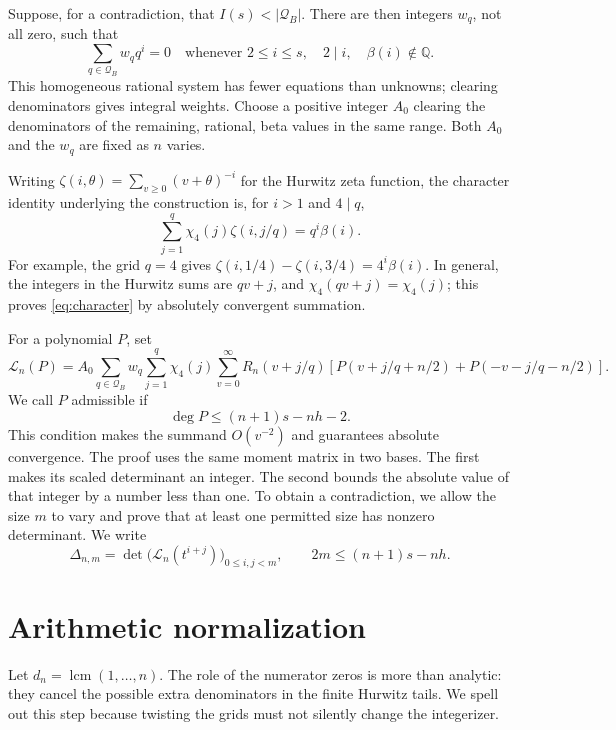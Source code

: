 \documentclass[11pt]{article}
\theoremstyle{remark}
\newcommand{\Q}{\mathbb Q}
\newcommand{\Lcal}{\mathcal L}
\DeclareMathOperator{\lcm}{lcm}
\numberwithin{equation}{section}
\begin{document}
Suppose, for a contradiction, that $I(s)<|\mathcal Q_B|$. There are then
integers $w_q$, not all zero, such that
\begin{equation}\label{eq:elimination}
 \sum_{q\in\mathcal Q_B}w_q q^i=0
 \quad\text{whenever }2\leq i\leq s,\quad2\mid i,\quad\beta(i)\notin\Q.
\end{equation}
This homogeneous rational system has fewer equations than unknowns; clearing
denominators gives integral weights. Choose a positive integer $A_0$ clearing
the denominators of the remaining, rational, beta values in the same range.
Both $A_0$ and the $w_q$ are fixed as $n$ varies.

Writing $\zeta(i,\theta)=\sum_{v\geq0}(v+\theta)^{-i}$ for the Hurwitz
zeta function, the character identity underlying the construction is,
for $i>1$ and $4\mid q$,
\begin{equation}\label{eq:character}
 \sum_{j=1}^q\chi_4(j)\zeta(i,j/q)=q^i\beta(i).
\end{equation}
For example, the grid $q=4$ gives
$\zeta(i,1/4)-\zeta(i,3/4)=4^i\beta(i)$.
In general, the integers in the Hurwitz sums are $qv+j$, and
$\chi_4(qv+j)=\chi_4(j)$; this proves \eqref{eq:character} by absolutely
convergent summation.

For a polynomial $P$, set
\begin{equation}\label{eq:functional}
 \Lcal_n(P)=A_0\sum_{q\in\mathcal Q_B}w_q\sum_{j=1}^q\chi_4(j)
  \sum_{v=0}^{\infty}
  R_n(v+j/q)
  \left[P(v+j/q+n/2)+P(-v-j/q-n/2)\right].
\end{equation}
We call $P$ admissible if
\begin{equation}\label{eq:admissible}
 \deg P\leq(n+1)s-nh-2.
\end{equation}
This condition makes the summand $O(v^{-2})$ and guarantees absolute
convergence. The proof uses the same moment matrix in two bases. The
first makes its scaled determinant an integer. The second bounds the
absolute value of that integer by a number less than one. To obtain a
contradiction, we allow the size $m$ to vary and prove that at least one
permitted size has nonzero determinant. We write
\begin{equation}\label{eq:det}
 \Delta_{n,m}=\det\bigl(\Lcal_n(t^{i+j})\bigr)_{0\leq i,j<m},
 \qquad 2m\leq(n+1)s-nh.
\end{equation}

\section{Arithmetic normalization}\label{sec:arithmetic}
Let $d_n=\lcm(1,\ldots,n)$. The role of the numerator zeros is more than
analytic: they cancel the possible extra denominators in the finite
Hurwitz tails. We spell out this step because twisting the grids must not
silently change the integerizer.
\end{document}
